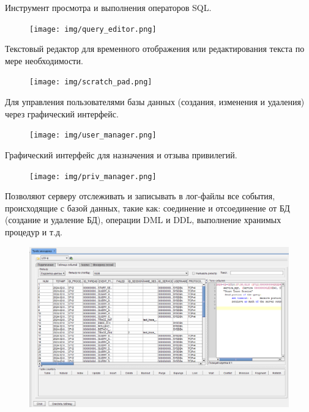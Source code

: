 
Инструмент просмотра и выполнения операторов SQL.
	\begin{figure}[H]
		\centering
		\texttt{[image: img/query\_editor.png]}
	\end{figure}


Текстовый редактор для временного отображения или редактирования текста по мере необходимости.
	\begin{figure}[H]
		\centering
		\texttt{[image: img/scratch\_pad.png]}
	\end{figure}


Для управления пользователями базы данных (создания, изменения и удаления) через графический интерфейс.
	
	\begin{figure}[H]
		\centering
		\texttt{[image: img/user\_manager.png]}
	\end{figure}


Графический интерфейс для назначения и отзыва привилегий.
	\begin{figure}[H]
		\centering
		\texttt{[image: img/priv\_manager.png]}
	\end{figure}


Позволяют серверу отслеживать и записывать в лог-файлы все события, происходящие с базой данных, такие как: соединение и отсоединение от БД (создание и удаление БД), операции DML и DDL, выполнение хранимых процедур и т.д.
	\begin{figure}[H]
		\centering
		\includegraphics[width = 0.8\linewidth]{img/trace_manager.png}
	\end{figure}

